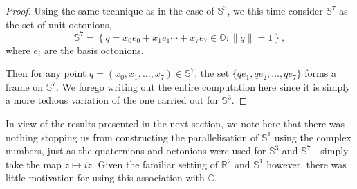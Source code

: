 \begin{proof}
Using the same technique as in the case of $\mathbb{S}^3$, we this time consider $\mathbb{S}^7$ as the set of unit octonions,
\[
\mathbb{S}^7=\left\{q=x_0e_0+x_1e_1\cdots+x_7e_7\in\mathbb{O}:\|q\|=1 \right\},
\]
where $e_i$ are the basis octonions.

Then for any point $q=(x_0,x_1,\ldots,x_7)\in\mathbb{S}^7$, the set $\{qe_1,qe_2,\ldots,qe_7\}$ forms a frame on $\mathbb{S}^7$.
We forego writing out the entire computation here since it is simply a more tedious variation of the one carried out for $\mathbb{S}^3$.

\end{proof}
\begin{remark}
In view of the results presented in the next section, we note here that there was nothing stopping us from constructing the parallelisation of $\mathbb{S}^1$ using the complex numbers, just as the quaternions and octonions were used for $\mathbb{S}^3$ and $\mathbb{S}^7$ - simply take the map $z\mapsto iz$. Given the familiar setting of $\mathbb{R}^2$ and $\mathbb{S}^1$ however, there was little motivation for using this association with $\mathbb{C}$.
\end{remark}

\pagebreak
